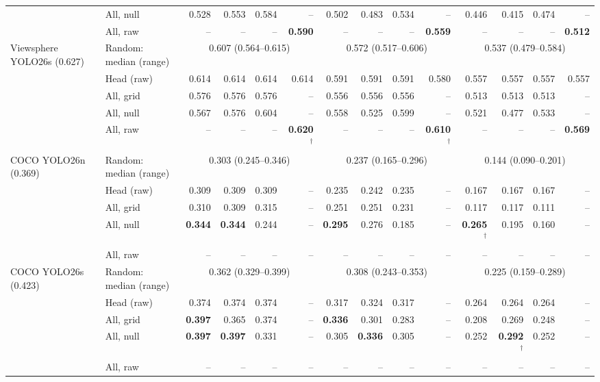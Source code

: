 \begin{tabular}{llrrrrrrrrrrrr}
 & All, null & 0.528 & 0.553 & 0.584 & -- & 0.502 & 0.483 & 0.534 & -- & 0.446 & 0.415 & 0.474 & -- \\
 & All, raw & -- & -- & -- & \textbf{0.590} & -- & -- & -- & \textbf{0.559} & -- & -- & -- & \textbf{0.512} \\
\midrule
Viewsphere YOLO26s (0.627) & Random: median (range) & \multicolumn{4}{c}{0.607 (0.564--0.615)} & \multicolumn{4}{c}{0.572 (0.517--0.606)} & \multicolumn{4}{c}{0.537 (0.479--0.584)} \\
 & Head (raw) & 0.614 & 0.614 & 0.614 & 0.614 & 0.591 & 0.591 & 0.591 & 0.580 & 0.557 & 0.557 & 0.557 & 0.557 \\
 & All, grid & 0.576 & 0.576 & 0.576 & -- & 0.556 & 0.556 & 0.556 & -- & 0.513 & 0.513 & 0.513 & -- \\
 & All, null & 0.567 & 0.576 & 0.604 & -- & 0.558 & 0.525 & 0.599 & -- & 0.521 & 0.477 & 0.533 & -- \\
 & All, raw & -- & -- & -- & \textbf{0.620$^\dagger$} & -- & -- & -- & \textbf{0.610$^\dagger$} & -- & -- & -- & \textbf{0.569} \\
\midrule
COCO YOLO26n (0.369) & Random: median (range) & \multicolumn{4}{c}{0.303 (0.245--0.346)} & \multicolumn{4}{c}{0.237 (0.165--0.296)} & \multicolumn{4}{c}{0.144 (0.090--0.201)} \\
 & Head (raw) & 0.309 & 0.309 & 0.309 & -- & 0.235 & 0.242 & 0.235 & -- & 0.167 & 0.167 & 0.167 & -- \\
 & All, grid & 0.310 & 0.309 & 0.315 & -- & 0.251 & 0.251 & 0.231 & -- & 0.117 & 0.117 & 0.111 & -- \\
 & All, null & \textbf{0.344} & \textbf{0.344} & 0.244 & -- & \textbf{0.295} & 0.276 & 0.185 & -- & \textbf{0.265$^\dagger$} & 0.195 & 0.160 & -- \\
 & All, raw & -- & -- & -- & -- & -- & -- & -- & -- & -- & -- & -- & -- \\
\midrule
COCO YOLO26s (0.423) & Random: median (range) & \multicolumn{4}{c}{0.362 (0.329--0.399)} & \multicolumn{4}{c}{0.308 (0.243--0.353)} & \multicolumn{4}{c}{0.225 (0.159--0.289)} \\
 & Head (raw) & 0.374 & 0.374 & 0.374 & -- & 0.317 & 0.324 & 0.317 & -- & 0.264 & 0.264 & 0.264 & -- \\
 & All, grid & \textbf{0.397} & 0.365 & 0.374 & -- & \textbf{0.336} & 0.301 & 0.283 & -- & 0.208 & 0.269 & 0.248 & -- \\
 & All, null & \textbf{0.397} & \textbf{0.397} & 0.331 & -- & 0.305 & \textbf{0.336} & 0.305 & -- & 0.252 & \textbf{0.292$^\dagger$} & 0.252 & -- \\
 & All, raw & -- & -- & -- & -- & -- & -- & -- & -- & -- & -- & -- & -- \\
\bottomrule
\end{tabular}
